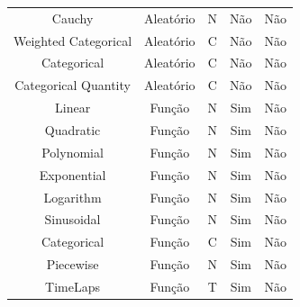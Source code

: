 \documentclass[
	12pt,				%
	openright,			%
	oneside,			%
	a4paper,			%
	english,			%
	brazil				%
	]{abntex2}
\begin{document}
\begin{table}[h]
\begin{tabular}{c|c|c|c|c}
				Cauchy               & Aleatório  & N\footnotemark[1]                                         & Não        & Não \\
				Weighted Categorical & Aleatório  & C\footnotemark[2]                                         & Não        & Não \\
				Categorical          & Aleatório  & C\footnotemark[2]                                         & Não        & Não \\
				Categorical Quantity & Aleatório  & C\footnotemark[2]                                         & Não        & Não \\
				Linear               & Função     & N\footnotemark[1]                                         & Sim        & Não \\
				Quadratic            & Função     & N\footnotemark[1]                                         & Sim        & Não \\
				Polynomial           & Função     & N\footnotemark[1]                                         & Sim        & Não \\
				Exponential          & Função     & N\footnotemark[1]                                         & Sim        & Não \\
				Logarithm            & Função     & N\footnotemark[1]                                         & Sim        & Não \\
				Sinusoidal           & Função     & N\footnotemark[1]                                         & Sim        & Não \\
				Categorical          & Função     & C\footnotemark[2]                                         & Sim        & Não \\
				Piecewise            & Função     & N\footnotemark[1]                                         & Sim        & Não \\
				TimeLaps             & Função     & T\footnotemark[3]                                         & Sim        & Não \\

\end{tabular}
\end{table}
\end{document}
